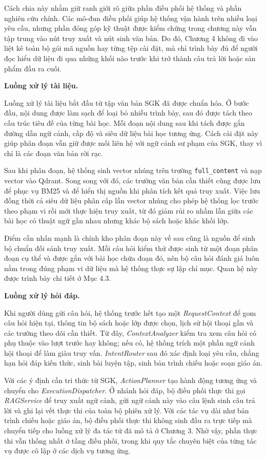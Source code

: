 \documentclass[../DoAn.tex]{subfiles}
\begin{document}
Cách chia này nhằm giữ ranh giới rõ giữa phần điều phối hệ thống và phần nghiên cứu chính. Các mô-đun điều phối giúp hệ thống vận hành trên nhiều loại yêu cầu, nhưng phần đóng góp kỹ thuật được kiểm chứng trong chương này vẫn tập trung vào nút truy xuất và nút sinh văn bản. Do đó, Chương 4 không đi vào liệt kê toàn bộ gói mã nguồn hay từng tệp cài đặt, mà chỉ trình bày đủ để người đọc hiểu dữ liệu đi qua những khối nào trước khi trở thành câu trả lời hoặc sản phẩm đầu ra cuối.

\textbf{Luồng xử lý tài liệu.}

Luồng xử lý tài liệu bắt đầu từ tập văn bản SGK đã được chuẩn hóa. Ở bước đầu, nội dung được làm sạch để loại bỏ nhiễu trình bày, sau đó được tách theo cấu trúc tiêu đề của từng bài học. Mỗi đoạn nội dung sau khi tách được gắn đường dẫn ngữ cảnh, cấp độ và siêu dữ liệu bài học tương ứng. Cách cài đặt này giúp phân đoạn vẫn giữ được mối liên hệ với ngữ cảnh sư phạm của SGK, thay vì chỉ là các đoạn văn bản rời rạc.

Sau khi phân đoạn, hệ thống sinh vector nhúng trên trường \texttt{full\_content} và nạp vector vào Qdrant. Song song với đó, các trường văn bản cần thiết cũng được lưu để phục vụ BM25 và để hiển thị nguồn khi phân tích kết quả truy xuất. Việc lưu đồng thời cả siêu dữ liệu phân cấp lẫn vector nhúng cho phép hệ thống lọc trước theo phạm vi rồi mới thực hiện truy xuất, từ đó giảm rủi ro nhầm lẫn giữa các bài học có thuật ngữ gần nhau nhưng khác bộ sách hoặc khác khối lớp.

Điểm cần nhấn mạnh là chính kho phân đoạn này về sau cũng là nguồn để sinh bộ chuẩn đối sánh truy xuất. Mỗi câu hỏi kiểm thử được sinh từ một đoạn phân đoạn cụ thể và được gắn với bài học chứa đoạn đó, nên bộ câu hỏi đánh giá luôn nằm trong đúng phạm vi dữ liệu mà hệ thống thực sự lập chỉ mục. Quan hệ này được trình bày chi tiết ở Mục 4.3.

\textbf{Luồng xử lý hỏi đáp.}

Khi người dùng gửi câu hỏi, hệ thống trước hết tạo một \textit{RequestContext} để gom câu hỏi hiện tại, thông tin bộ sách hoặc lớp được chọn, lịch sử hội thoại gần và các trường theo dõi cần thiết. Từ đây, \textit{ContextAnalyzer} kiểm tra xem câu hỏi có phụ thuộc vào lượt trước hay không; nếu có, hệ thống trích một phần ngữ cảnh hội thoại để làm giàu truy vấn. \textit{IntentRouter} sau đó xác định loại yêu cầu, chẳng hạn hỏi đáp kiến thức, sinh bài luyện tập, sinh bản trình chiếu hoặc soạn giáo án.

Với các ý định cần tri thức từ SGK, \textit{ActionPlanner} tạo hành động tương ứng và chuyển cho \textit{ExecutionDispatcher}. Ở nhánh hỏi đáp, bộ điều phối thực thi gọi \textit{RAGService} để truy xuất ngữ cảnh, gửi ngữ cảnh này vào câu lệnh sinh câu trả lời và ghi lại vết thực thi của toàn bộ phiên xử lý. Với các tác vụ dài như bản trình chiếu hoặc giáo án, bộ điều phối thực thi không sinh đầu ra trực tiếp mà chuyển tiếp cho luồng xử lý đa tác tử đã mô tả ở Chương 3. Nhờ vậy, phần thực thi vẫn thống nhất ở tầng điều phối, trong khi quy tắc chuyên biệt của từng tác vụ được cô lập ở các dịch vụ tương ứng.
\end{document}
